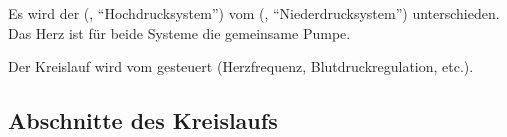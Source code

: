    
  
Es wird der  (, "`Hochdrucksystem"') vom
 (,
"`Niederdrucksystem"') unterschieden. Das Herz ist für 
beide Systeme die gemeinsame Pumpe.

Der Kreislauf wird vom  gesteuert
(Herzfrequenz, Blutdruckregulation, etc.).

\subsection{Abschnitte des Kreislaufs}
\vspace{-1em}  

